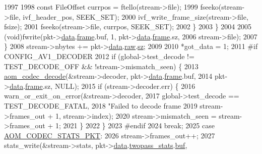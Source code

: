 \begin{DoxyCodeInclude}
{{{{{{{{{{{{{{{{{{{{{{{{{{{{{{{{{{{{{{1997 
1998               \textcolor{keyword}{const} FileOffset currpos = ftello(stream->file);
1999               fseeko(stream->file, ivf\_header\_pos, SEEK\_SET);
2000               ivf\_write\_frame\_size(stream->file, fsize);
2001               fseeko(stream->file, currpos, SEEK\_SET);
2002             \}
2003           \}
2004 
2005           (void)fwrite(pkt->\hyperlink{structaom__codec__cx__pkt_afb379cd4bfa7692d1d6e85f4e4b2b410}{data}.\hyperlink{structaom__codec__cx__pkt_a4180a6ae59b0d295bc915d4689df4cb0}{frame}.buf, 1, pkt->\hyperlink{structaom__codec__cx__pkt_afb379cd4bfa7692d1d6e85f4e4b2b410}{data}.\hyperlink{structaom__codec__cx__pkt_a4180a6ae59b0d295bc915d4689df4cb0}{frame}.sz,
2006                        stream->file);
2007         \}
2008         stream->nbytes += pkt->\hyperlink{structaom__codec__cx__pkt_afb379cd4bfa7692d1d6e85f4e4b2b410}{data}.\hyperlink{structaom__codec__cx__pkt_a4fc6ea5e240c5df0acbf77aa2fe5ec6f}{raw}.\hyperlink{structaom__fixed__buf_a02f47e8b960c332c60a8aa4b7e37426f}{sz};
2009 
2010         *got\_data = 1;
2011 \textcolor{preprocessor}{#if CONFIG\_AV1\_DECODER}
2012         \textcolor{keywordflow}{if} (global->test\_decode != TEST\_DECODE\_OFF && !stream->mismatch\_seen) \{
2013           \hyperlink{group__decoder_gab03fdb999d1f83a5896869a3ba5f68f7}{aom\_codec\_decode}(&stream->decoder, pkt->\hyperlink{structaom__codec__cx__pkt_afb379cd4bfa7692d1d6e85f4e4b2b410}{data}.\hyperlink{structaom__codec__cx__pkt_a4180a6ae59b0d295bc915d4689df4cb0}{frame}.buf,
2014                            pkt->\hyperlink{structaom__codec__cx__pkt_afb379cd4bfa7692d1d6e85f4e4b2b410}{data}.\hyperlink{structaom__codec__cx__pkt_a4180a6ae59b0d295bc915d4689df4cb0}{frame}.sz, NULL);
2015           \textcolor{keywordflow}{if} (stream->decoder.err) \{
2016             warn\_or\_exit\_on\_error(&stream->decoder,
2017                                   global->test\_decode == TEST\_DECODE\_FATAL,
2018                                   \textcolor{stringliteral}{"Failed to decode frame %
2019                                   stream->frames\_out + 1, stream->index);
2020             stream->mismatch\_seen = stream->frames\_out + 1;
2021           \}
2022         \}
2023 \textcolor{preprocessor}{#endif}
2024         \textcolor{keywordflow}{break};
2025       \textcolor{keywordflow}{case} \hyperlink{group__encoder_ggafeb69da4a9649a54e805f59c26d8dfeda7dcdcb6c401cac64ca98b51f52de8d4b}{AOM\_CODEC\_STATS\_PKT}:
2026         stream->frames\_out++;
2027         stats\_write(&stream->stats, pkt->\hyperlink{structaom__codec__cx__pkt_afb379cd4bfa7692d1d6e85f4e4b2b410}{data}.\hyperlink{structaom__codec__cx__pkt_a40d469839bcd8195c3c8e80db6561dbb}{twopass\_stats}.\hyperlink{structaom__fixed__buf_ac1b22da152c9839329d3780208dffd38}{buf},
}}}}}}}}}}}}}}}}}}}}}}}}}}}}}}}}}}}}}}}
\end{DoxyCodeInclude}
